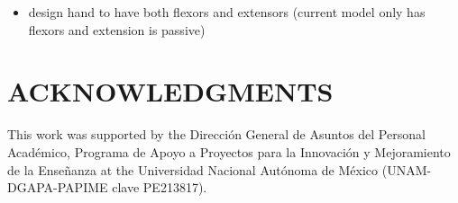 \documentclass[12pt]{article}
\begin{document}
\begin{itemize}
    \item design hand to have both flexors and extensors (current model only has flexors and extension is passive)
\end{itemize}

\section*{ACKNOWLEDGMENTS}
This work was
supported by the Dirección General de Asuntos del Personal Académico, Programa de Apoyo a Proyectos para la Innovación y Mejoramiento de la Enseñanza at the Universidad Nacional
Autónoma de México (UNAM-DGAPA-PAPIME clave PE213817).
 
\begin{small}

\end{small}
\end{document}

